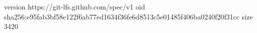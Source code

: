 version https://git-lfs.github.com/spec/v1
oid sha256:e95fab3bf58e122f6ab77ed1634f36fe6d8513c5e01485f406ba0240f20f31cc
size 3420
